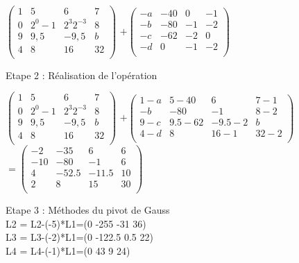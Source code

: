 $
\begin{pmatrix}
  1 & 5 & 6 & 7 \\
  0 & 2^{0}-1 & 2^{3}2^{-3} & 8 \\
  9 & 9,5 & -9,5 & b \\
  4 & 8 & 16 & 32 \\
\end{pmatrix}
$
\vspace{5mm} %
$
+
\begin{pmatrix}
  -a & -40 & 0 & -1 \\
  -b & -80 & -1 & -2 \\
  -c & -62 & -2 & 0 \\
  -d & 0  & -1 & -2 \\
\end{pmatrix}
$

Etape 2 : Réalisation de l'opération \\

\vspace{2mm} %

$
\begin{pmatrix}
  1 & 5 & 6 & 7 \\
  0 & 2^{0}-1 & 2^{3}2^{-3} & 8 \\
  9 & 9,5 & -9,5 & b \\
  4 & 8 & 16 & 32 \\
\end{pmatrix}
$
\vspace{3mm} %
$
+
\begin{pmatrix}
  1-a & 5-40 & 6 & 7-1 \\
  -b & -80 & -1 & 8-2 \\
  9-c & 9.5-62 & -9.5-2 & b \\
  4-d & 8  & 16-1 & 32-2 \\
\end{pmatrix}
$
\vspace{3mm} %
$
=
\begin{pmatrix}
  -2  & -35   & 6     & 6 \\
  -10 & -80   & -1    & 6 \\
  4   & -52.5 & -11.5 & 10 \\
  2   & 8     & 15    & 30 \\
\end{pmatrix}
$

Etape 3 : Méthodes du pivot de Gauss \\

L2 = L2-(-5)*L1=(0 -255 -31 36) \\
L3 = L3-(-2)*L1=(0 -122.5 0.5 22) \\
L4 = L4-(-1)*L1=(0 43 9 24) \\

